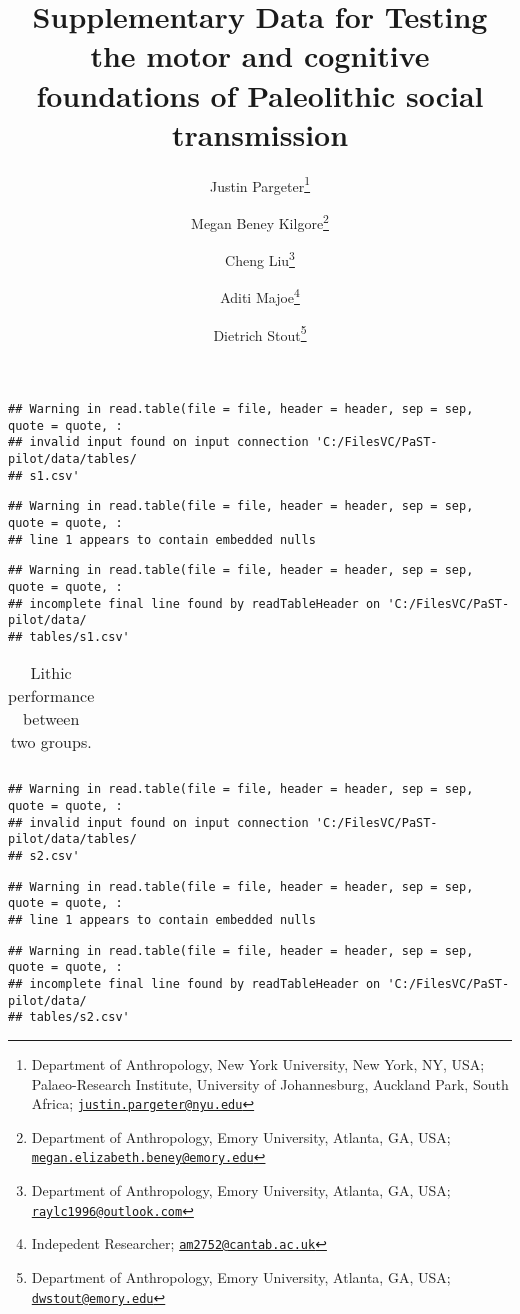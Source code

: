 \documentclass[
  11pt,
]{article}
\title{Supplementary Data for Testing the motor and cognitive foundations of Paleolithic social transmission}
\author{Justin Pargeter\footnote{Department of Anthropology, New York University, New York, NY, USA; Palaeo-Research Institute, University of Johannesburg, Auckland Park, South Africa; \href{mailto:justin.pargeter@nyu.edu}{\nolinkurl{justin.pargeter@nyu.edu}}} \and Megan Beney Kilgore\footnote{Department of Anthropology, Emory University, Atlanta, GA, USA; \href{mailto:megan.elizabeth.beney@emory.edu}{\nolinkurl{megan.elizabeth.beney@emory.edu}}} \and Cheng Liu\footnote{Department of Anthropology, Emory University, Atlanta, GA, USA; \href{mailto:raylc1996@outlook.com}{\nolinkurl{raylc1996@outlook.com}}} \and Aditi Majoe\footnote{Indepedent Researcher; \href{mailto:am2752@cantab.ac.uk}{\nolinkurl{am2752@cantab.ac.uk}}} \and Dietrich Stout\footnote{Department of Anthropology, Emory University, Atlanta, GA, USA; \href{mailto:dwstout@emory.edu}{\nolinkurl{dwstout@emory.edu}}}}
\date{}
\begin{document}
\maketitle

{
\hypersetup{linkcolor=}
\setcounter{tocdepth}{2}
\tableofcontents
}
\begin{verbatim}
## Warning in read.table(file = file, header = header, sep = sep, quote = quote, :
## invalid input found on input connection 'C:/FilesVC/PaST-pilot/data/tables/
## s1.csv'
\end{verbatim}

\begin{verbatim}
## Warning in read.table(file = file, header = header, sep = sep, quote = quote, :
## line 1 appears to contain embedded nulls
\end{verbatim}

\begin{verbatim}
## Warning in read.table(file = file, header = header, sep = sep, quote = quote, :
## incomplete final line found by readTableHeader on 'C:/FilesVC/PaST-pilot/data/
## tables/s1.csv'
\end{verbatim}

\begin{table}[H]

\caption{\label{tab:tab1}Lithic performance between two groups.}
\centering
\fontsize{7}{9}\selectfont
\begin{tabular}[t]{l}
\toprule
\cellcolor{gray!6}{PK...}\\


\bottomrule
\end{tabular}
\end{table}

\begin{verbatim}
## Warning in read.table(file = file, header = header, sep = sep, quote = quote, :
## invalid input found on input connection 'C:/FilesVC/PaST-pilot/data/tables/
## s2.csv'
\end{verbatim}

\begin{verbatim}
## Warning in read.table(file = file, header = header, sep = sep, quote = quote, :
## line 1 appears to contain embedded nulls
\end{verbatim}

\begin{verbatim}
## Warning in read.table(file = file, header = header, sep = sep, quote = quote, :
## incomplete final line found by readTableHeader on 'C:/FilesVC/PaST-pilot/data/
## tables/s2.csv'
\end{verbatim}
\end{document}
